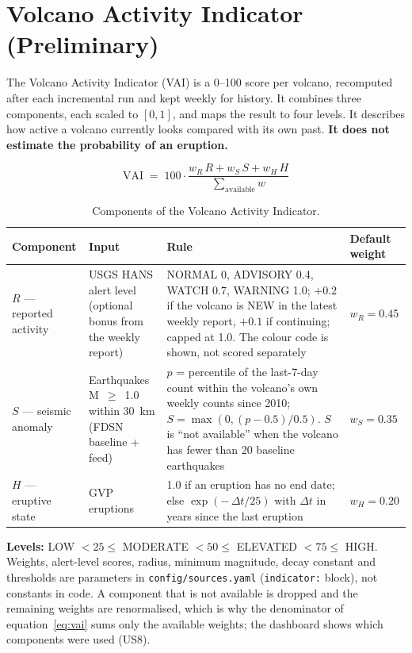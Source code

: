 \documentclass[11pt,a4paper]{article}
\begin{document}
\section{Volcano Activity Indicator (Preliminary)}
\label{sec:indicator}

The Volcano Activity Indicator (VAI) is a 0--100 score per volcano, recomputed after
each incremental run and kept weekly for history. It combines three components, each
scaled to $[0,1]$, and maps the result to four levels. It describes how active a
volcano currently looks compared with its own past. \textbf{It does not estimate the
probability of an eruption.}

\begin{equation}
\mathrm{VAI} \;=\; 100 \cdot
\frac{w_R\,R + w_S\,S + w_H\,H}{\displaystyle\sum_{\text{available}} w}
\label{eq:vai}
\end{equation}

\begin{table}[h]
\centering
\small
\setlength{\tabcolsep}{5pt}
\caption{Components of the Volcano Activity Indicator.}
\label{tab:vai}
\begin{tabular}{@{}L{2.6cm}L{3.6cm}L{6.9cm}L{1.9cm}@{}}
\toprule
\textbf{Component} & \textbf{Input} & \textbf{Rule} & \textbf{Default weight} \\
\midrule
$R$ --- reported activity &
USGS HANS alert level (optional bonus from the weekly report) &
NORMAL 0, ADVISORY 0.4, WATCH 0.7, WARNING 1.0; $+0.2$ if the volcano is NEW in the
latest weekly report, $+0.1$ if continuing; capped at 1.0. The colour code is shown,
not scored separately &
$w_R = 0.45$ \\
\addlinespace
$S$ --- seismic anomaly &
Earthquakes M~$\geq$~1.0 within 30~km (FDSN baseline + feed) &
$p$ = percentile of the last-7-day count within the volcano's own weekly counts since
2010; $S = \max\!\left(0, (p - 0.5)/0.5\right)$. $S$ is ``not available'' when the
volcano has fewer than 20 baseline earthquakes &
$w_S = 0.35$ \\
\addlinespace
$H$ --- eruptive state &
GVP eruptions &
1.0 if an eruption has no end date; else
$\exp\!\left(-\,\Delta t / 25\right)$ with $\Delta t$ in years since the last eruption &
$w_H = 0.20$ \\
\bottomrule
\end{tabular}
\end{table}

\noindent
\textbf{Levels:} LOW $<25\leq$ MODERATE $<50\leq$ ELEVATED $<75\leq$ HIGH. Weights,
alert-level scores, radius, minimum magnitude, decay constant and thresholds are
parameters in \texttt{config/sources.yaml} (\texttt{indicator:} block), not constants
in code. A component that is not available is dropped and the remaining weights are
renormalised, which is why the denominator of equation~\eqref{eq:vai} sums only the
available weights; the dashboard shows which components were used (US8).
\end{document}

